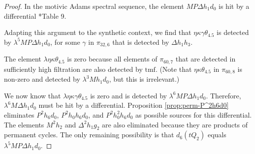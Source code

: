 \documentclass{amsart}
\theoremstyle{definition}
\newcommand{\tmf}{\mathrm{tmf}}
\newcommand{\D}{\Delta}
\begin{document}
\begin{proof}
In the motivic Adams spectral sequence, 
the element $M P \D h_1 d_0$ is hit by a differential \cite{IWX}*{Table 9}.

Adapting this argument to the synthetic context,
we find that $\eta \kappa \gamma \theta_{4.5}$ is detected
by $\lambda^5 M P \D h_1 d_0$, for some $\gamma$ in $\pi_{32,6}$
that is detected by $\D h_1 h_3$.

The element $\lambda \eta \kappa \theta_{4.5}$ is zero
because all elements of $\pi_{60, 7}$ that are detected in sufficiently
high filtration are also detected by $\tmf$.
(Note that $\eta \kappa \theta_{4.5}$ in $\pi_{60,8}$ is non-zero
and detected by $\lambda^3 M h_1 d_0$, but this is irrelevant.)

We now know that $\lambda \eta \kappa \gamma \theta_{4.5}$ is zero
and is detected by $\lambda^6 M P \D h_1 d_0$.
Therefore, 
$\lambda^6 M \D h_1 d_0$ must be hit by a differential.
Proposition \ref{prop:perm-P^2h6d0}
eliminates 
$P^2 h_6 d_0$, $P^2 h_0 h_6 d_0$, and $P^2 h_0^2 h_6 d_0$ as
possible sources for this differential.
The elements $M^2 h_2$ and $\D^2 h_1 g_2$ are
also eliminated because they are products of permanent cycles.
The only remaining possibility is that $d_6(t Q_2)$ equals
$\lambda^5 M P \D h_1 d_0$.
\end{proof}





\end{document}
